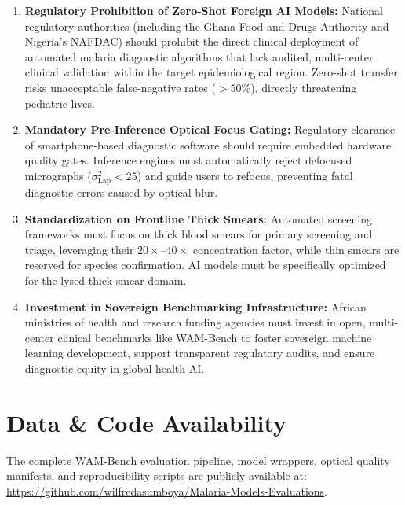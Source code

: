 \documentclass[a4paper,11pt]{article}
\begin{document}
\begin{enumerate}
    \item \textbf{Regulatory Prohibition of Zero-Shot Foreign AI Models:} National regulatory authorities (including the Ghana Food and Drugs Authority and Nigeria's NAFDAC) should prohibit the direct clinical deployment of automated malaria diagnostic algorithms that lack audited, multi-center clinical validation within the target epidemiological region. Zero-shot transfer risks unacceptable false-negative rates ($>50\%$), directly threatening pediatric lives.
    \item \textbf{Mandatory Pre-Inference Optical Focus Gating:} Regulatory clearance of smartphone-based diagnostic software should require embedded hardware quality gates. Inference engines must automatically reject defocused micrographs ($\sigma^2_{\text{Lap}} < 25$) and guide users to refocus, preventing fatal diagnostic errors caused by optical blur.
    \item \textbf{Standardization on Frontline Thick Smears:} Automated screening frameworks must focus on thick blood smears for primary screening and triage, leveraging their $20\times\text{--}40\times$ concentration factor, while thin smears are reserved for species confirmation. AI models must be specifically optimized for the lysed thick smear domain.
    \item \textbf{Investment in Sovereign Benchmarking Infrastructure:} African ministries of health and research funding agencies must invest in open, multi-center clinical benchmarks like WAM-Bench to foster sovereign machine learning development, support transparent regulatory audits, and ensure diagnostic equity in global health AI.
\end{enumerate}

\section*{Data \& Code Availability}
The complete WAM-Bench evaluation pipeline, model wrappers, optical quality manifests, and reproducibility scripts are publicly available at: \url{https://github.com/wilfredasumboya/Malaria-Models-Evaluations}.



\end{document}
